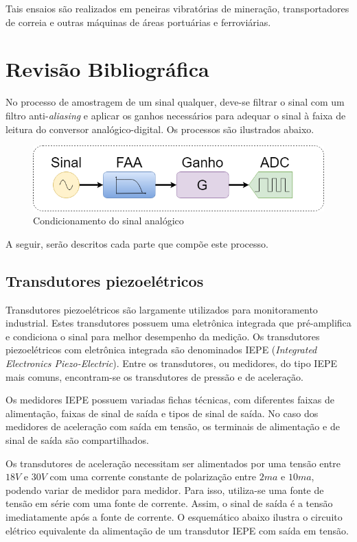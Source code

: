 \documentclass[11pt]{abntex2}
\begin{document}
		Tais ensaios são realizados em peneiras vibratórias de mineração,
        transportadores de correia e outras máquinas de áreas portuárias e ferroviárias.

		\chapter{Revisão Bibliográfica}
			No processo de amostragem de um sinal qualquer, deve-se filtrar o sinal com
			um filtro anti-\textit{aliasing} e aplicar os ganhos necessários para adequar
			o sinal à faixa de leitura do conversor analógico-digital. Os processos são
			ilustrados abaixo.

			\begin{figure}[H]
				\centering
				\includegraphics[width=\linewidth]{../../Fotos/Diagramas/sinalFaaADC/sinalFaaADC.png}
				\caption{Condicionamento do sinal analógico}
				\label{fig:condicionamentoSinal}
			\end{figure}

			A seguir, serão descritos cada parte que compõe este processo.

			\section{Transdutores piezoelétricos}
				Transdutores piezoelétricos são largamente utilizados para
				monitoramento industrial. Estes transdutores possuem uma eletrônica
				integrada que pré-amplifica e condiciona o sinal para melhor
				desempenho da medição. Os transdutores piezoelétricos com eletrônica
				integrada são denominados IEPE (\textit{Integrated Electronics
				Piezo-Electric}). Entre os transdutores, ou medidores, do tipo IEPE
				mais comuns, encontram-se os transdutores de pressão e de
				aceleração.

				Os medidores IEPE possuem variadas fichas técnicas, com diferentes
				faixas de alimentação, faixas de sinal de saída e tipos de sinal de
				saída. No caso dos medidores de aceleração com saída em tensão, os
				terminais de alimentação e de sinal de saída são compartilhados.

				Os transdutores de aceleração necessitam ser alimentados por uma
				tensão entre $18V$ e $30V$ com uma corrente constante de polarização
				entre $2ma$ e $10ma$, podendo variar de medidor para medidor. Para
				isso, utiliza-se uma fonte de tensão em série com uma fonte de
				corrente. Assim, o sinal de saída é a tensão imediatamente após a
				fonte de corrente. O esquemático abaixo ilustra o circuito elétrico
				equivalente da alimentação de um transdutor IEPE com saída em
				tensão.
\end{document}
